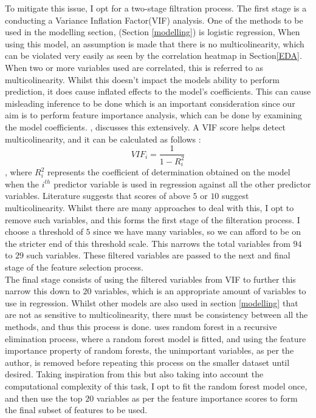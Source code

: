 \documentclass[11pt]{article}
\begin{document}
To mitigate this issue, I opt for a two-stage filtration process. The first stage is a conducting a Variance Inflation Factor(VIF) analysis. One of the methods to be used in the modelling section, (Section \ref{modelling}) is logistic regression, When using this model, an assumption is made that there is no multicolinearity, which can be violated very easily as seen by the correlation heatmap in Section\ref{EDA}. When two or more variables used are correlated, this is referred to as multicolinearity. Whilst this doesn't impact the models ability to perform prediction, it does cause inflated effects to the model's coefficients. This can cause misleading inference to be done which is an important consideration since our aim is to perform feature importance analysis, which can be done by examining the model coefficients. \cite{multicolinearity}, \cite{multicolinearity_midi} discusses this extensively. A VIF score helps detect multicolinearity, and it can be calculated as follows : 
$$
VIF_{i} = \frac{1}{1 - R_i^2} 
$$,
where $R_i^2$ represents the coefficient of determination obtained on the model when the $i^{th}$ predictor variable is used in regression against all the other predictor variables. Literature suggests that scores of above $5$ or $10$ suggest multicolinearity. Whilst there are many approaches to deal with this, I opt to remove such variables, and this forms the first stage of the filteration process. I choose a threshold of $5$ since we have many variables, so we can afford to be on the stricter end of this threshold scale. This narrows the total variables from $94$ to $29$ such variables. These filtered variables are passed to the next and final stage of the feature selection process. \\

The final stage consists of using the filtered variables from VIF to further this narrow this down to $20$ variables, which is an appropriate amount of variables to use in regression. Whilst other models are also used in section \ref{modelling} that are not as sensitive to multicolinearity, there must be consistency between all the methods, and thus this process is done. \cite{random_forest_rfe} uses random forest in a recursive elimination process, where a random forest model is fitted, and using the feature importance property of random forests, the unimportant variables, as per the author, is removed before repeating this process on the smaller dataset until desired. Taking inspiration from this but also taking into account the computational complexity of this task, I opt to fit the random forest model once, and then use the top $20$ variables as per the feature importance scores to form the final subset of features to be used. \\
\end{document}
